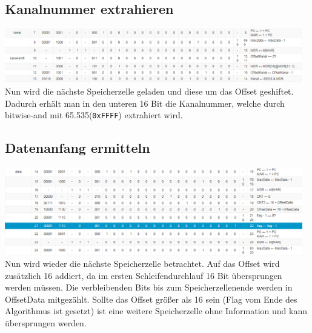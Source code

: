 \documentclass[12pt,titlepage,german,a4]{article}
\begin{document}
    \subsection{Kanalnummer extrahieren }
	\includegraphics[width=13cm]{img/k2.png} \\
    Nun wird die n{\"a}chste Speicherzelle geladen und diese um das Offset geshiftet. Dadurch erh{\"a}lt man in den unteren 16 Bit die Kanalnummer, welche durch bitwise-and mit 65.535(\texttt{0xFFFF}) extrahiert wird.

    \subsection{Datenanfang ermitteln}
	\includegraphics[width=13cm]{img/k3.png} \\
    Nun wird wieder die n{\"a}chste Speicherzelle betrachtet. Auf das Offset wird zus{\"a}tzlich 16 addiert, da im ersten Schleifendurchlauf 16 Bit {\"u}bersprungen werden m{\"u}ssen. Die verbleibenden Bits bis zum Speicherzellenende werden in OffsetData mitgez{\"a}hlt. Sollte das Offset gr{\"o}{\ss}er als 16 sein (Flag vom Ende des Algorithmus ist gesetzt) ist eine weitere Speicherzelle ohne Information und kann {\"u}bersprungen werden.
\end{document}
